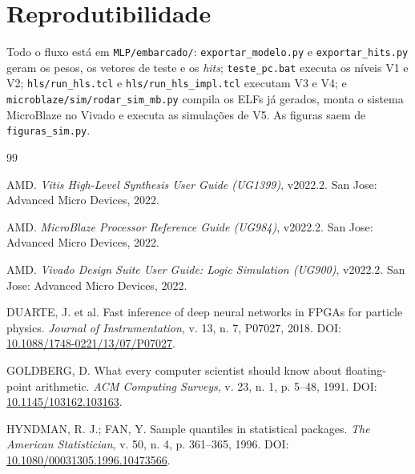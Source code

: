 \documentclass[12pt]{article}
\begin{document}
\section*{Reprodutibilidade}

Todo o fluxo está em \texttt{MLP/embarcado/}: \texttt{exportar\_modelo.py} e \texttt{exportar\_hits.py} geram os pesos, os vetores de teste e os \textit{hits}; \texttt{teste\_pc.bat} executa os níveis V1 e V2; \texttt{hls/run\_hls.tcl} e \texttt{hls/run\_hls\_impl.tcl} executam V3 e V4; e \texttt{microblaze/sim/rodar\_sim\_mb.py} compila os ELFs já gerados, monta o sistema MicroBlaze no Vivado e executa as simulações de V5. As figuras saem de \texttt{figuras\_sim.py}.

\begin{thebibliography}{99}

	AMD.
	\newblock \emph{Vitis High-Level Synthesis User Guide (UG1399)}, v2022.2.
	\newblock San Jose: Advanced Micro Devices, 2022.

	AMD.
	\newblock \emph{MicroBlaze Processor Reference Guide (UG984)}, v2022.2.
	\newblock San Jose: Advanced Micro Devices, 2022.

	AMD.
	\newblock \emph{Vivado Design Suite User Guide: Logic Simulation (UG900)}, v2022.2.
	\newblock San Jose: Advanced Micro Devices, 2022.

	DUARTE, J. et al.
	\newblock Fast inference of deep neural networks in FPGAs for particle physics.
	\newblock \emph{Journal of Instrumentation}, v. 13, n. 7, P07027, 2018.
	\newblock DOI: \href{https://doi.org/10.1088/1748-0221/13/07/P07027}{10.1088/1748-0221/13/07/P07027}.

	GOLDBERG, D.
	\newblock What every computer scientist should know about floating-point arithmetic.
	\newblock \emph{ACM Computing Surveys}, v. 23, n. 1, p. 5--48, 1991.
	\newblock DOI: \href{https://doi.org/10.1145/103162.103163}{10.1145/103162.103163}.

	HYNDMAN, R. J.; FAN, Y.
	\newblock Sample quantiles in statistical packages.
	\newblock \emph{The American Statistician}, v. 50, n. 4, p. 361--365, 1996.
	\newblock DOI: \href{https://doi.org/10.1080/00031305.1996.10473566}{10.1080/00031305.1996.10473566}.


\end{thebibliography}
\end{document}
